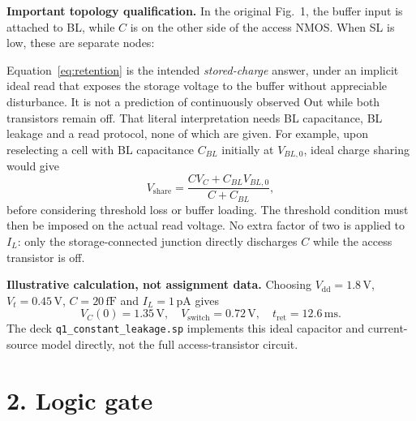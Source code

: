 \documentclass[11pt,a4paper]{article}
\newcommand{\VDD}{V_{\mathrm{dd}}}
\newcommand{\VTH}{V_t}
\newcommand{\IL}{I_L}
\begin{document}
\textbf{Important topology qualification.} In the original Fig.~1, the
buffer input is attached to BL, while $C$ is on the other side of the
access NMOS. When SL is low, these are separate nodes:
\begin{center}
\end{center}
Equation~\eqref{eq:retention} is the intended \emph{stored-charge} answer,
under an implicit ideal read that exposes the storage voltage to the buffer
without appreciable disturbance. It is not a prediction of continuously
observed Out while both transistors remain off. That literal interpretation
needs BL capacitance, BL leakage and a read protocol, none of which are given.
For example, upon reselecting a cell with BL capacitance $C_{BL}$ initially
at $V_{BL,0}$, ideal charge sharing would give
\[
 V_{\mathrm{share}}=\frac{CV_C+C_{BL}V_{BL,0}}{C+C_{BL}},
\]
before considering threshold loss or buffer loading. The threshold condition
must then be imposed on the actual read voltage. No extra factor of two
is applied to $\IL$: only the storage-connected junction directly discharges
$C$ while the access transistor is off.

\textbf{Illustrative calculation, not assignment data.} Choosing
$\VDD=1.8\,\mathrm{V}$, $\VTH=0.45\,\mathrm{V}$,
$C=20\,\mathrm{fF}$ and $\IL=1\,\mathrm{pA}$ gives
\[
 V_C(0)=1.35\,\mathrm{V},\quad V_{\mathrm{switch}}=0.72\,\mathrm{V},
 \quad t_{\mathrm{ret}}=12.6\,\mathrm{ms}.
\]
The deck \texttt{q1\_constant\_leakage.sp} implements this ideal capacitor
and current-source model directly, not the full access-transistor circuit.

\section*{2. Logic gate}
\end{document}
